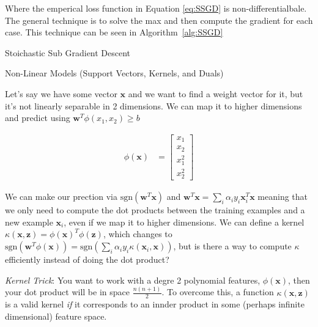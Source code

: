 \documentclass{article}
\newcommand{\sgn}[1]{\text{sgn}\left( #1\right)}
\begin{document}
Where the emperical loss function in Equation \ref{eq:SSGD} is non-differentialbale. The general technique is to solve the max and then compute the gradient for each case. This technique can be seen in Algorithm~\ref{alg:SSGD}

\begin{algorithm}[H]
\begin{algorithmic}
  \ELSE
  \ENDIF
  \ENDFOR
\ENDFOR
{}
\end{algorithmic}
\caption{Stoichastic Sub Gradient Descent}
\label{alg:SSGD}
\end{algorithm}

{\large Non-Linear Models (Support Vectors, Kernels, and Duals)}

Let's say we have some vector $\mathbf{x}$ and we want to find a weight vector for it, but it's not linearly separable in 2 dimensions. We can map it to higher dimensions and predict using $\mathbf{w}^{T}\phi(x_{1},x_{2})\geq b$

\begin{align}
\phi(\mathbf{x}) &= \left[\begin{array}{c} x_{1}\\ x_{2}\\ x_{1}^{2}\\ x_{2}^{2}\end{array}\right]
\end{align}

We can make our prection via $\sgn{\mathbf{w}^{T}\mathbf{x}}$ and $\mathbf{w}^{T}\mathbf{x} = \sum_{i}\alpha_{i}y_{i}\mathbf{x}^{T}_{i}\mathbf{x}$ meaning that we only need to compute the dot products between the training examples and a new example $\mathbf{x}_{i}$, even if we map it to higher dimensions. We can define a kernel $\kappa(\mathbf{x},\mathbf{z})=\phi(\mathbf{x})^{T}\phi(\mathbf{z})$, which changes to $\sgn{\mathbf{w}^{T}\phi(\mathbf{x})} = \sgn{\sum_{i}\alpha_{i}y_{i}\kappa(\mathbf{x}_{i},\mathbf{x})}$, but is there a way to compute $\kappa$ efficiently instead of doing the dot product? 

{\em Kernel Trick}: You want to work with a degre 2 polynomial features, $\phi(\mathbf{x})$, then your dot product will be in space $\frac{n(n+1)}{2}$. To overcome this, a function $\kappa(\mathbf{x},\mathbf{z})$ is a valid kernel {\em if} it corresponds to an innder product in some (perhaps infinite dimensional) feature space.
\end{document}
